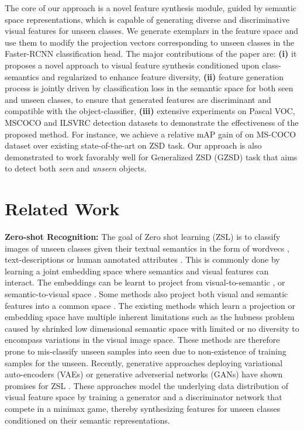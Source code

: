 \documentclass[runningheads]{llncs}
\begin{document}
The core of our approach is a novel feature synthesis module, guided by semantic space representations, which is capable of generating diverse and discriminative visual features for unseen classes. 
We generate exemplars in the feature space and use them to modify the projection vectors corresponding to unseen classes in the Faster-RCNN classification head. The major contributions of the paper are: \textbf{(i)} it proposes a novel approach to visual feature synthesis conditioned upon class-semantics and regularized to enhance feature diversity, \textbf{(ii)} feature generation process is jointly driven by classification loss in the semantic space for both seen and unseen classes, to ensure that generated features are discriminant and compatible with the object-classifier, \textbf{(iii)} extensive experiments on Pascal VOC, MSCOCO and ILSVRC detection datasets to demonstrate the effectiveness of the proposed method. For instance, we achieve a relative mAP gain of  on MS-COCO dataset over existing state-of-the-art on ZSD task. Our approach is also demonstrated to work favorably well for Generalized ZSD (GZSD) task that aims to detect both \emph{seen} and \emph{unseen} objects. 


\section{Related Work}
\noindent\textbf{Zero-shot Recognition:}
The goal of Zero shot learning (ZSL) is to classify images of unseen classes given their textual semantics in the form of wordvecs \cite{zhang2017learning}, text-descriptions \cite{lei2015predicting,li2019zero} or human annotated attributes \cite{annadani2018preserving}. This is commonly done by learning a joint embedding space where semantics and visual features can interact. The embeddings can be learnt to project from visual-to-semantic \cite{lampert2013attribute}, or semantic-to-visual space \cite{zhang2017learning}. Some methods also project both visual and semantic features into a common space \cite{akata2015evaluation}. The existing methods which learn a projection or embedding space have multiple inherent limitations such as the hubness problem \cite{dinu2014improving} caused by shrinked low dimensional semantic space with limited or no diversity to encompass variations in the visual image space. These methods are therefore prone to mis-classify unseen samples into seen due to non-existence of training samples for the unseen. 
Recently, generative approaches deploying variational auto-encoders (VAEs) or generative adverserial networks (GANs) have shown promises for ZSL \cite{chen2018zero,xian2018feature,zhu2018generative,khan2018adversarial}. These approaches model the underlying data distribution of visual feature space by training a generator and a discriminator network that compete in a minimax game, thereby synthesizing features for unseen classes conditioned on their semantic representations. 
 
\end{document}
